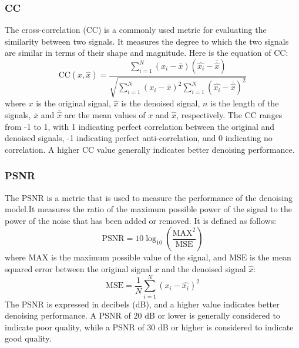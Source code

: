 \documentclass[a4paper]{sapthesis}
\begin{document}
\subsubsection{CC}
The cross-correlation (CC) is a commonly used metric for evaluating the
 similarity between two signals. It measures the degree to which the two
  signals are similar in terms of their shape and magnitude. Here is the 
equation of CC:
\begin{equation}
\text{CC}(x,\hat{x}) = \frac{\sum_{i=1}^{N} (x_i - \bar{x})(\hat{x_i} - \bar{\hat{x}})}{\sqrt{\sum_{i=1}^{N} (x_i - \bar{x})^2 \sum_{i=1}^{N} (\hat{x_i} - \bar{\hat{x}})^2}}
\end{equation}
where $x$ is the original signal, $\hat{x}$ is the denoised signal, 
$n$ is the length of the signals, $\bar{x}$ and $\bar{\hat{x}}$ are 
the mean values of $x$ and $\hat{x}$, respectively.\newline
The CC ranges from -1 to 1, with 1 indicating perfect correlation between 
the original and denoised signals, -1 indicating perfect anti-correlation, 
and 0 indicating no correlation. A higher CC value generally indicates 
better denoising performance.
\subsubsection{PSNR}
The PSNR is a metric that is used to measure the performance of the
denoising model.It measures the ratio of the maximum possible power of 
the signal to the power of the noise that has been added or removed. 
It is defined as follows:
\begin{equation}
\text{PSNR} = 10 \log_{10} \left(\frac{\text{MAX}^2}{\text{MSE}}\right)
\end{equation}
where $\text{MAX}$ is the maximum possible value of the signal, 
and $\text{MSE}$ is the mean squared error between the original 
signal $x$ and the denoised signal $\hat{x}$:
\begin{equation}
\text{MSE} = \frac{1}{N}\sum_{i=1}^{N} (x_i - \hat{x_i})^2
\end{equation}
The PSNR is expressed in decibels (dB), and a higher value indicates 
better denoising performance. A PSNR of 20 dB or lower is generally 
considered to indicate poor quality, while a PSNR of 30 dB or higher 
is considered to indicate good quality.
\end{document}
